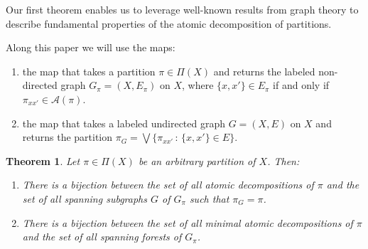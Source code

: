 \documentclass[12pt]{extarticle}
\newtheorem{Theorem}{Theorem}
\begin{document}
	Our first theorem enables us to leverage well-known results from graph theory to describe fundamental properties of the atomic decomposition of partitions.
	
	Along this paper we will use the maps:
	\begin{enumerate}
		\item the map that takes a partition $\pi\in\Pi(X)$ and returns the labeled non-directed graph $G_{\pi}=(X,E_{\pi})$ on $X$, where $\{x,x'\}\in E_{\pi}$ if and only if $\pi_{xx'}\in \mathcal{A}(\pi)$.
		\item the map that takes a labeled undirected graph $G=(X,E)$ on $X$ and returns the partition $\pi_G=\bigvee\{\pi_{xx'}\,:\, \{x,x'\}\in E\}$.
	\end{enumerate}
	
	\begin{Theorem}\label{Bijection} Let $\pi\in\Pi(X)$ be an arbitrary partition of $X$. Then:
		\begin{enumerate}
			\item There is a bijection between the set of all atomic decompositions of $\pi$ and the set of all spanning subgraphs $G$ of $G_{\pi}$ such that $\pi_G=\pi$.
			\item There is a bijection between the set of all minimal atomic decompositions of $\pi$ and the set of all spanning forests of $G_{\pi}$.
		\end{enumerate}		 	
	\end{Theorem}
\end{document}

